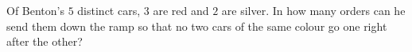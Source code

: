 Of Benton's $5$ distinct cars, $3$ are red and $2$ are silver. In how many orders can he send them down the ramp so that no two cars of the same colour go one right after the other?
